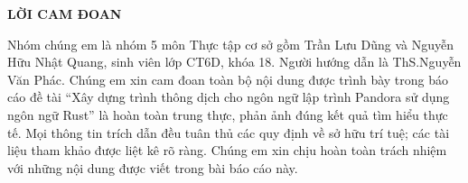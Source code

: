 \begin{center}
    \bf{LỜI CAM ĐOAN}
\end{center}

Nhóm chúng em là nhóm 5 môn Thực tập cơ sở gồm Trần Lưu Dũng và Nguyễn Hữu Nhật Quang, sinh viên lớp CT6D, khóa 18. Người hướng dẫn là ThS.Nguyễn Văn Phác. Chúng em xin cam đoan toàn bộ nội dung được trình bày trong báo cáo đề tài “Xây dựng trình thông dịch cho ngôn ngữ lập trình Pandora sử dụng ngôn ngữ Rust” là hoàn toàn trung thực, phản ảnh đúng kết quả tìm hiểu thực tế. Mọi thông tin trích dẫn đều tuân thủ các quy định về sở hữu trí tuệ; các tài liệu tham khảo được liệt kê rõ ràng. Chúng em xin chịu hoàn toàn trách nhiệm với những nội dung được viết trong bài báo cáo này.
